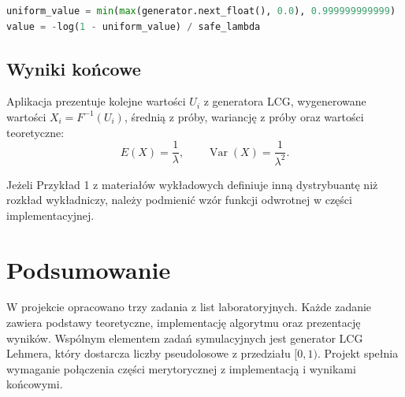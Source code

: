 \documentclass[12pt,a4paper]{article}
\begin{document}
\begin{lstlisting}[language=Python]
uniform_value = min(max(generator.next_float(), 0.0), 0.999999999999)
value = -log(1 - uniform_value) / safe_lambda
\end{lstlisting}

\subsection{Wyniki końcowe}

Aplikacja prezentuje kolejne wartości $U_i$ z generatora LCG, wygenerowane wartości $X_i=F^{-1}(U_i)$, średnią z próby, wariancję z próby oraz wartości teoretyczne:
\begin{equation}
  E(X)=\frac{1}{\lambda},\qquad \operatorname{Var}(X)=\frac{1}{\lambda^2}.
\end{equation}

Jeżeli Przykład 1 z materiałów wykładowych definiuje inną dystrybuantę niż rozkład wykładniczy, należy podmienić wzór funkcji odwrotnej w części implementacyjnej.

\section{Podsumowanie}

W projekcie opracowano trzy zadania z list laboratoryjnych. Każde zadanie zawiera podstawy teoretyczne, implementację algorytmu oraz prezentację wyników. Wspólnym elementem zadań symulacyjnych jest generator LCG Lehmera, który dostarcza liczby pseudolosowe z przedziału $[0,1)$. Projekt spełnia wymaganie połączenia części merytorycznej z implementacją i wynikami końcowymi.
\end{document}
